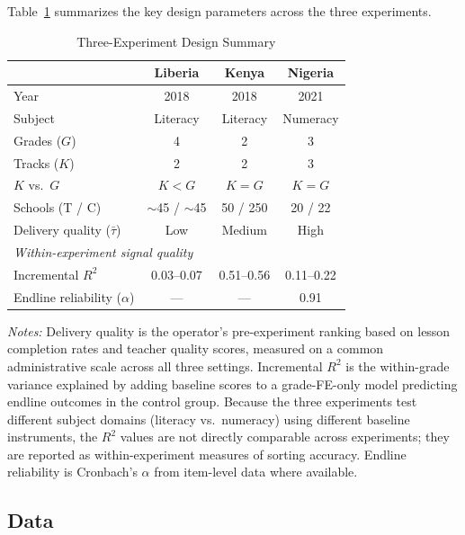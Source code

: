 \documentclass[11pt]{article}
\begin{document}
Table~\ref{tab:design_summary} summarizes the key design parameters across the three experiments.

\begin{table}[H]
\centering
\caption{Three-Experiment Design Summary}
\label{tab:design_summary}
\begin{threeparttable}
\begin{tabular}[t]{lccc}
\toprule
 & Liberia & Kenya & Nigeria \\
\midrule
Year & 2018 & 2018 & 2021 \\
Subject & Literacy & Literacy & Numeracy \\
Grades ($G$) & 4 & 2 & 3 \\
Tracks ($K$) & 2 & 2 & 3 \\
$K$ vs.\ $G$ & $K < G$ & $K = G$ & $K = G$ \\
Schools (T / C) & $\sim$45 / $\sim$45 & 50 / 250 & 20 / 22 \\
Delivery quality ($\bar{\tau}$) & Low & Medium & High \\
\midrule
\multicolumn{4}{l}{\textit{Within-experiment signal quality}} \\
Incremental $R^2$ & 0.03--0.07 & 0.51--0.56 & 0.11--0.22 \\
Endline reliability ($\alpha$) & --- & --- & 0.91 \\
\bottomrule
\end{tabular}
\begin{tablenotes}
\footnotesize
\item \textit{Notes:} Delivery quality is the operator's pre-experiment ranking based on lesson completion rates and teacher quality scores, measured on a common administrative scale across all three settings. Incremental $R^2$ is the within-grade variance explained by adding baseline scores to a grade-FE-only model predicting endline outcomes in the control group. Because the three experiments test different subject domains (literacy vs.\ numeracy) using different baseline instruments, the $R^2$ values are not directly comparable across experiments; they are reported as within-experiment measures of sorting accuracy. Endline reliability is Cronbach's $\alpha$ from item-level data where available.
\end{tablenotes}
\end{threeparttable}
\end{table}

\subsection{Data}
\end{document}
